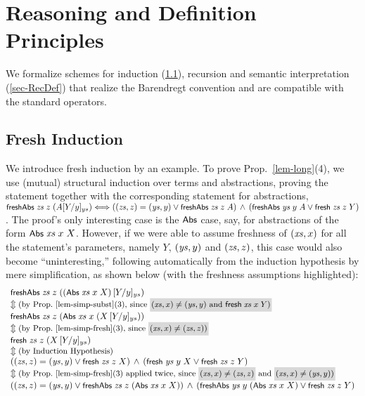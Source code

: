 \documentclass{llncs}
\newcommand\coll[1]{\mbox{\colorbox{light-gray}{$\!#1\!$}}}
\begin{document}
\section{ Reasoning and Definition 
Principles} \label{sec-reas} 

We formalize schemes for induction (\ref{Ind}), recursion and semantic interpretation (\ref{sec-RecDef}) that 
realize the Barendregt %
convention and are compatible 
with the standard operators. %

\subsection{Fresh Induction} \label{Ind}

We introduce fresh induction by an example. 
To prove Prop.~\ref{lem-long}(4), we use (mutual) structural induction over terms and abstractions, 
proving the statement together with the corresponding statement for abstractions,  
%
$\mbox{\rm\textsf{\small freshAbs}}\;\mbox{\textit{zs}}\;z\;(A[Y / y]_{ys}) 
\Longleftrightarrow
((\mbox{\textit{zs}},z) = (\mbox{\textit{ys}},y) \lor \mbox{\rm\textsf{\small freshAbs}}\;\mbox{\textit{zs}}\;z\;A) \,\land\,  (\mbox{\rm\textsf{\small freshAbs}}\;\mbox{\textit{ys}}\;y\;A \lor \mbox{\rm\textsf{\small fresh}}\;\mbox{\textit{zs}}\;z\;Y)
$. 
%
The proof's only interesting case 
is the $\mbox{\rm\textsf{\small Abs}}$ case, say, for abstractions of the form 
$\mbox{\rm\textsf{\small Abs}}\;\mbox{\textit{xs}}\;x\;X$. 
However, 
if we were able to assume freshness of $(\mbox{\textit{xs}},x)$ for all the statement's parameters, 
namely $Y$, $(\mbox{\textit{ys}},y)$ and $(\mbox{\textit{zs}},z)$,  
this case would also become ``uninteresting,'' following automatically from the induction hypothesis 
by mere 
simplification, as shown below (with the freshness assumptions highlighted):  %
%
$$
\begin{array}{l}
\freshAbs\;\zs\;z\;((\Abs\;\xs\;x\;X)\,[Y/y]_{ys}) \\
  \Updownarrow \mbox{\small (by Prop.~\ref{lem-simp-subst}(3), since 
\coll{\mbox{$(\xs,x) \not= (\ys,y)$ and $\fresh\;\xs\;x\;Y$)}}
} \\
\freshAbs\;\zs\;z\;(\Abs\;\xs\;x\;(X\,[Y/y]_{ys})) \\
  \Updownarrow \mbox{\small (by Prop.~\ref{lem-simp-fresh}(3), since \coll{\mbox{$(\xs,x) \not= (\zs,z)$)}}} \\
\fresh\;\zs\;z\;(X\,[Y/y]_{ys}) \\
  \Updownarrow \mbox{\small (by Induction Hypothesis)} \\
((\zs,z) = (\ys,y) \lor \fresh\;\zs\;z\;X) \,\land\,  (\fresh\;\ys\;y\;X \lor \fresh\;\zs\;z\;Y) \\
  \Updownarrow \mbox{\small (by Prop.~\ref{lem-simp-fresh}(3) applied twice, 
since \coll{\mbox{$(\xs,x) \not= (\zs,z)$}} and \coll{\mbox{$(\xs,x) \not= (\ys,y)$)}} } \\
((\zs,z) = (\ys,y) \lor \freshAbs\;\zs\;z\;(\Abs\;\xs\;x\;X)) \,\land\,  (\freshAbs\;\ys\;y\;(\Abs\;\xs\;x\;X) \lor \fresh\;\zs\;z\;Y)
\end{array} 
$$
\end{document}
